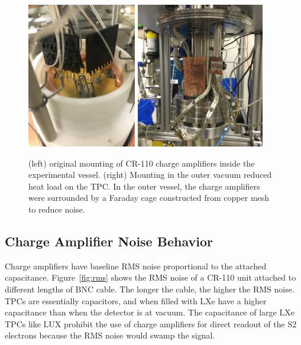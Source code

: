  \begin{figure}[htbp]
\begin{center}
\includegraphics[height=2.5in, keepaspectratio]{figures/testbed/chargeamp_mount1.jpg}
\includegraphics[height=2.5in, keepaspectratio]{figures/testbed/chargeamp_mount2.jpg}
\caption{(left) original mounting of CR-110 charge amplifiers inside the experimental vessel. (right) Mounting in the outer vacuum reduced heat load on the \acs{TPC}. In the outer vessel, the charge amplifiers were surrounded by a Faraday cage constructed from copper mesh to reduce noise.}
\label{fig:chargeamp_mount}
\end{center}
\end{figure}

\subsection{Charge Amplifier Noise Behavior}
Charge amplifiers have baseline RMS noise proportional to the attached capacitance. Figure~\ref{fig:rms} shows the RMS noise of a CR-110 unit attached to different lengths of BNC cable. The longer the cable, the higher the RMS noise. \ac{TPC}s are essentially capacitors, and when filled with \ac{LXe} have a higher capacitance than when the detector is at vacuum. The capacitance of large \ac{LXe} \ac{TPC}s like \ac{LUX} prohibit the use of charge amplifiers for direct readout of the S2 electrons because the RMS noise would swamp the signal. 

